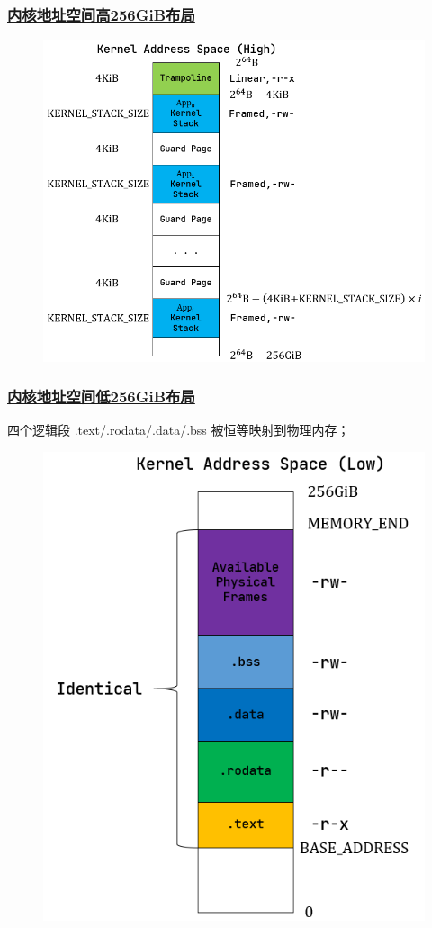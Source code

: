 \begin{frame}
    \frametitle{\href{https://rcore-os.github.io/rCore-Tutorial-Book-v3/_images/kernel-as-high.png}{内核地址空间高256GiB布局}}
% 
% 
    \begin{figure}
        \centering
        \includegraphics[width=0.5\linewidth]{figs/kernel-as-high.png}
    \end{figure}
% 
% 
\end{frame}
\begin{frame}
    \frametitle{\href{https://rcore-os.github.io/rCore-Tutorial-Book-v3/_images/kernel-as-low.png}{内核地址空间低256GiB布局}}
四个逻辑段 .text/.rodata/.data/.bss 被恒等映射到物理内存；
    \begin{figure}
        \centering
        \includegraphics[width=0.35\linewidth]{figs/kernel-as-low.png}
    \end{figure}
% 
% 
% 
% 
% 
% 
% 
% 
\end{frame}

